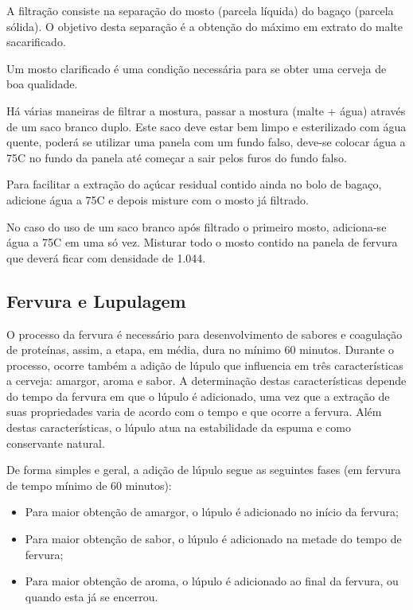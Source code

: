 A filtração consiste na separação do mosto (parcela líquida) do bagaço (parcela sólida). O objetivo desta separação é a obtenção do máximo em extrato do malte sacarificado.

Um mosto clarificado é uma condição necessária para se obter uma cerveja de boa qualidade.

Há várias maneiras de filtrar a mostura, passar a mostura (malte + água) através de um saco branco duplo. Este saco deve estar bem limpo e esterilizado com água quente, poderá se utilizar uma panela com um fundo falso, deve-se colocar água a 75\textdegree C no fundo da panela até começar a sair pelos furos do fundo falso.

Para facilitar a extração do açúcar residual contido ainda no bolo de bagaço, adicione água a 75\textdegree C e depois misture com o mosto já filtrado.

No caso do uso de um saco branco após filtrado o primeiro mosto, adiciona-se água a 75\textdegree C em uma só vez. Misturar todo o mosto contido na panela de fervura que deverá ficar com densidade de 1.044.

\subsection{Fervura e Lupulagem}

O processo da fervura é necessário para desenvolvimento de sabores e coagulação de proteínas, assim, a etapa, em média, dura no mínimo 60 minutos. Durante o processo, ocorre também a adição de lúpulo que influencia em três características a cerveja: amargor, aroma e sabor. A determinação destas características depende do tempo da fervura em que o lúpulo é adicionado, uma vez que a extração de suas propriedades varia de acordo com o tempo e que ocorre a fervura. Além destas características, o lúpulo atua na estabilidade da espuma e como conservante natural.

De forma simples e geral, a adição de lúpulo segue as seguintes fases (em fervura de tempo mínimo de 60 minutos):

\begin{itemize}
    \item Para maior obtenção de amargor, o lúpulo é adicionado no início da fervura;
    \item Para maior obtenção de sabor, o lúpulo é adicionado na metade do tempo de fervura;
    \item Para maior obtenção de aroma, o lúpulo é adicionado ao final da fervura, ou quando esta já se encerrou.
\end{itemize}

